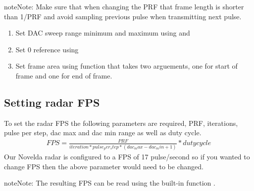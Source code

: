 \documentclass[letterpaper,10pt,english]{sphinxmanual}
\begin{document}
\begin{sphinxadmonition}{note}{Note:}
Make sure that when changing the PRF that frame length is shorter than 1/PRF and avoid sampling previous pulse when transmitting next pulse.
\end{sphinxadmonition}
\begin{enumerate}
\def\theenumi{\arabic{enumi}}
\def\labelenumi{\theenumi .}
\makeatletter\def\p@enumii{\p@enumi \theenumi .}\makeatother
\setcounter{enumi}{2}
\item {} 
Set DAC sweep range minimum and maximum using  and 

\item {} 
Set 0 reference using 

\item {} 
Set frame area using function  that takes two arguements, one for start of frame and one for end of frame.

\end{enumerate}


\subsection{Setting radar FPS}
\label{\detokenize{radar information:setting-radar-fps}}
To set the radar FPS the following parameters are required, PRF, iterations, pulse per step, dac max and dac min range as well as duty cycle.
\begin{equation*}
\begin{split}FPS = \frac{PRF}{iteration*pulse_per_step*(dac_max-dac_min+1)} * duty cycle\end{split}
\end{equation*}
Our Novelda radar is configured to a FPS of 17 pulse/second so if you wanted to change FPS then the above parameter would need to be changed.

\begin{sphinxadmonition}{note}{Note:}
The resulting FPS can be read using the built-in function .
\end{sphinxadmonition}
\end{document}
